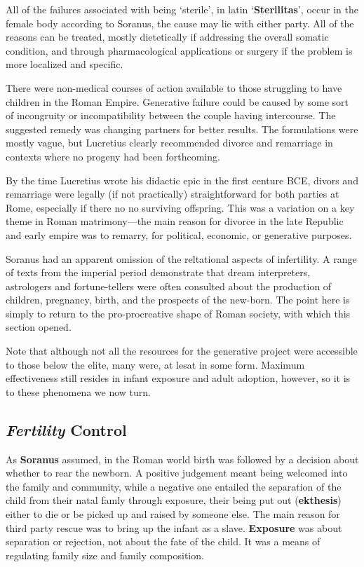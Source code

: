 All of the failures associated with being `sterile', in latin `\textbf{Sterilitas}', occur in the female body according to Soranus, the cause may lie with either party. All of the reasons can be treated, mostly dietetically if addressing the overall somatic condition, and through pharmacological applications or surgery if the problem is more localized and specific.

There were non-medical courses of action available to those struggling to have children in the Roman Empire. Generative failure could be caused by some sort of incongruity or incompatibility between the couple having intercourse. The suggested remedy was changing partners for better results. The formulations were mostly vague, but Lucretius clearly recommended divorce and remarriage in contexts where no progeny had been forthcoming.


\begin{nte}
    By the time Lucretius wrote his didactic epic in the first centure BCE, divors and remarriage were legally (if not practically) straightforward for both parties at Rome, especially if there no no surviving offspring. This was a variation on a key theme in Roman matrimony---the main reason for divorce in the late Republic and early empire was to remarry, for political, economic, or generative purposes.
\end{nte}

Soranus had an apparent omission of the reltational aspects of infertility. A range of texts from the imperial period demonstrate that dream interpreters, astrologers and fortune-tellers were often consulted about the production of children, pregnancy, birth, and the prospects of the new-born. The point here is simply to return to the pro-procreative shape of Roman society, with which this section opened.

Note that although not all the resources for the generative project were accessible to those below the elite, many were, at lesat in some form. Maximum effectiveness still resides in infant exposure and adult adoption, however, so it is to these phenomena we now turn.

\subsection{\textit{Fertility} Control}

As \textbf{Soranus} assumed, in the Roman world birth was followed by a decision about whether to rear the newborn. A positive judgement meant being welcomed into the family and community, while a negative one entailed the separation of the child from their natal famly through exposure, their being put out (\textbf{ekthesis}) either to die or be picked up and raised by someone else. The main reason for third party rescue was to bring up the infant as a slave. \textbf{Exposure} was about separation or rejection, not about the fate of the child. It was a means of regulating family size and family composition.

